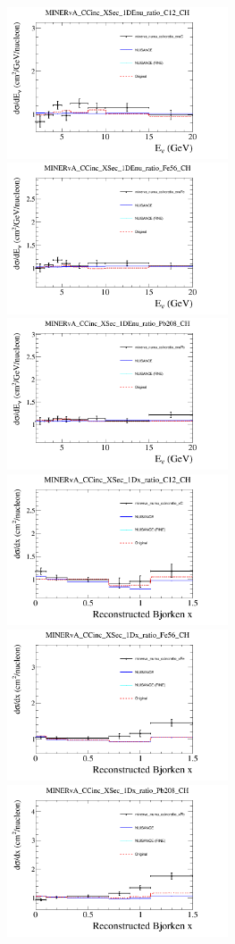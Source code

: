 \documentclass{article}
\begin{document}
\centering
\includegraphics[width=0.49\textwidth]{figures/minerva_numu_ccincratio_enuC_comp.png}
\\\centering
\includegraphics[width=0.49\textwidth]{figures/minerva_numu_ccincratio_enuFe_comp.png}
\\\centering
\includegraphics[width=0.49\textwidth]{figures/minerva_numu_ccincratio_enuPb_comp.png}
\\\centering
\includegraphics[width=0.49\textwidth]{figures/minerva_numu_ccincratio_xC_comp.png}
\\\centering
\includegraphics[width=0.49\textwidth]{figures/minerva_numu_ccincratio_xFe_comp.png}
\\\centering
\includegraphics[width=0.49\textwidth]{figures/minerva_numu_ccincratio_xPb_comp.png}
\\
\end{document}
